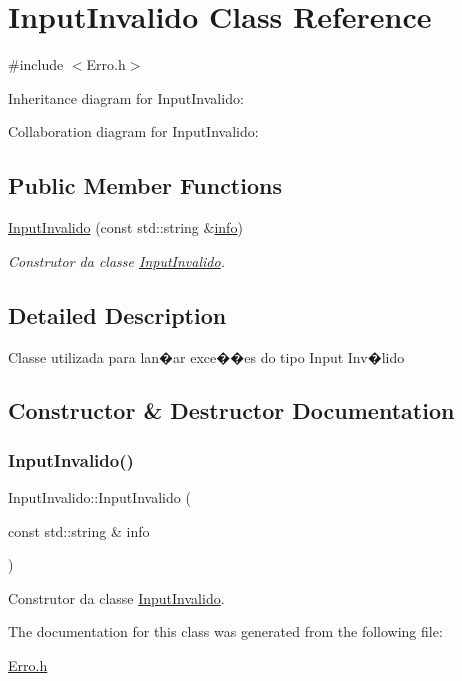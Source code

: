 \hypertarget{class_input_invalido}{}\section{Input\+Invalido Class Reference}
\label{class_input_invalido}


{\ttfamily \#include $<$Erro.\+h$>$}



Inheritance diagram for Input\+Invalido\+:


Collaboration diagram for Input\+Invalido\+:
\subsection*{Public Member Functions}
\begin{DoxyCompactItemize}
\item 
\mbox{\hyperlink{class_input_invalido_aa24dddc4e0de404949099c741266e193}{Input\+Invalido}} (const std\+::string \&\mbox{\hyperlink{class_erro_a3ecaaf6f8e15a0830a648035b456cb62}{info}})
\begin{DoxyCompactList}\small\item\em Construtor da classe \mbox{\hyperlink{class_input_invalido}{Input\+Invalido}}. \end{DoxyCompactList}\end{DoxyCompactItemize}


\subsection{Detailed Description}
Classe utilizada para lan�ar exce��es do tipo Input Inv�lido 

\subsection{Constructor \& Destructor Documentation}
\mbox{\label{class_input_invalido_aa24dddc4e0de404949099c741266e193}} 
\subsubsection{\texorpdfstring{Input\+Invalido()}{InputInvalido()}}
{\footnotesize\ttfamily Input\+Invalido\+::\+Input\+Invalido (\begin{DoxyParamCaption}\item[{const std\+::string \&}]{info }\end{DoxyParamCaption})\hspace{0.3cm}{\ttfamily [inline]}}



Construtor da classe \mbox{\hyperlink{class_input_invalido}{Input\+Invalido}}. 



The documentation for this class was generated from the following file\+:\begin{DoxyCompactItemize}
\item 
\mbox{\hyperlink{_erro_8h}{Erro.\+h}}\end{DoxyCompactItemize}
